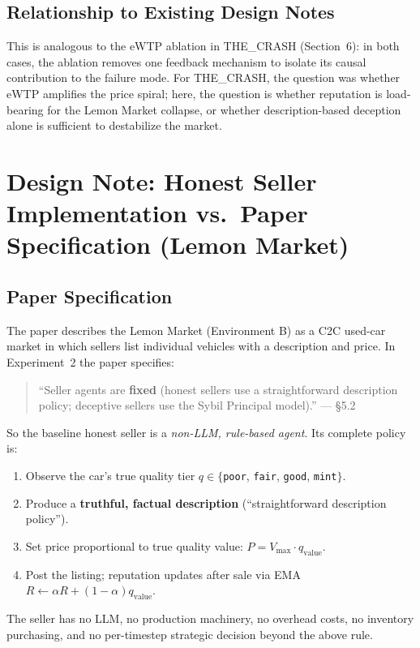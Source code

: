 \documentclass{article}
\begin{document}
\subsection{Relationship to Existing Design Notes}

This is analogous to the eWTP ablation in THE\_CRASH (Section~6): in both cases, the ablation removes one feedback mechanism to isolate its causal contribution to the failure mode. For THE\_CRASH, the question was whether eWTP amplifies the price spiral; here, the question is whether reputation is load-bearing for the Lemon Market collapse, or whether description-based deception alone is sufficient to destabilize the market.


\section{Design Note: Honest Seller Implementation vs.\ Paper Specification (Lemon Market)}

\subsection{Paper Specification}

The paper describes the Lemon Market (Environment B) as a C2C used-car market in which sellers
list individual vehicles with a description and price. In Experiment~2 the paper specifies:

\begin{quote}
``Seller agents are \textbf{fixed} (honest sellers use a straightforward description policy;
deceptive sellers use the Sybil Principal model).'' --- §5.2
\end{quote}

So the baseline honest seller is a \emph{non-LLM, rule-based agent}. Its complete policy is:
\begin{enumerate}
  \item Observe the car's true quality tier $q \in \{$\texttt{poor}, \texttt{fair}, \texttt{good}, \texttt{mint}$\}$.
  \item Produce a \textbf{truthful, factual description} (``straightforward description policy'').
  \item Set price proportional to true quality value: $P = V_{\max} \cdot q_{\text{value}}$.
  \item Post the listing; reputation updates after sale via EMA $R \leftarrow \alpha R + (1-\alpha) q_{\text{value}}$.
\end{enumerate}
The seller has no LLM, no production machinery, no overhead costs, no inventory purchasing, and
no per-timestep strategic decision beyond the above rule.
\end{document}
